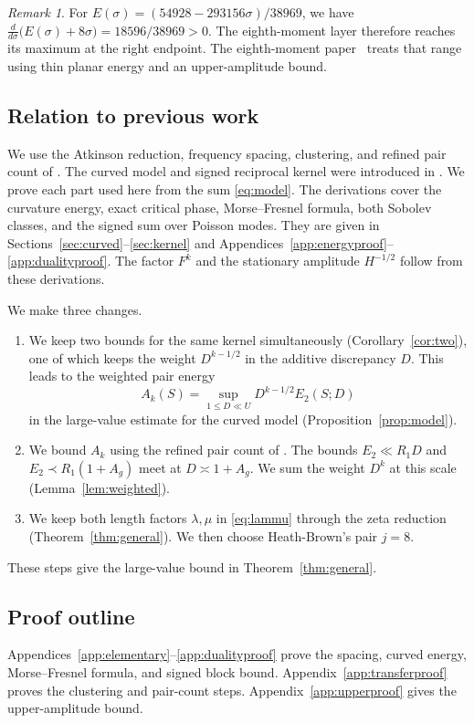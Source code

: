 \documentclass[11pt]{amsart}
\theoremstyle{definition}
\theoremstyle{remark}
\newtheorem{remark}[theorem]{Remark}
\numberwithin{equation}{section}
\begin{document}
\begin{remark}\label{rem:eighth}
For $E(\sigma)=(54928-293156\sigma)/38969$, we have
$\frac{d}{d\sigma}\big(E(\sigma)+8\sigma\big)=18596/38969>0$.
The eighth-moment layer therefore reaches its maximum at the right
endpoint. The eighth-moment paper~\cite{Thin} treats that range using
thin planar energy and an upper-amplitude bound.
\end{remark}

\subsection{Relation to previous work}\label{sec:new}
We use the Atkinson reduction, frequency spacing, clustering, and
refined pair count of \cite{dFP}. The curved model and signed reciprocal
kernel were introduced in \cite{B38}. We prove each part used here from
the sum \eqref{eq:model}. The derivations cover the curvature
energy, exact critical phase, Morse--Fresnel formula, both Sobolev
classes, and the signed sum over Poisson modes. They are given in
Sections~\ref{sec:curved}--\ref{sec:kernel} and
Appendices~\ref{app:energyproof}--\ref{app:dualityproof}.
The factor $F^k$ and the stationary amplitude $H^{-1/2}$ follow from
these derivations.

We make three changes.
\begin{enumerate}[label=(\roman*)]
\item We keep two bounds for the same kernel simultaneously (Corollary~\ref{cor:two}), one of which keeps the weight $D^{k-1/2}$ in the additive discrepancy $D$. This leads to the weighted pair energy
\[
A_k(S)=\sup_{1\le D\ll U}D^{k-1/2}E_2(S;D)
\]
in the large-value estimate for the curved model (Proposition~\ref{prop:model}).
\item We bound $A_k$ using the refined pair count of \cite{dFP}.
The bounds $E_2\ll R_1D$ and $E_2\prec R_1(1+A_g)$ meet at
$D\asymp1+A_g$. We sum the weight $D^k$ at this scale
(Lemma~\ref{lem:weighted}).
\item We keep both length factors $\lambda,\mu$ in \eqref{eq:lammu}
through the zeta reduction (Theorem~\ref{thm:general}).
We then choose Heath-Brown's pair $j=8$.
\end{enumerate}
These steps give the large-value bound in Theorem~\ref{thm:general}.

\subsection{Proof outline}\label{sec:status}
Appendices~\ref{app:elementary}--\ref{app:dualityproof} prove the
spacing, curved energy, Morse--Fresnel formula, and signed block bound.
Appendix~\ref{app:transferproof} proves the clustering and pair-count
steps. Appendix~\ref{app:upperproof} gives the upper-amplitude bound.
\end{document}
